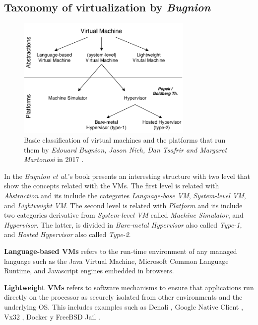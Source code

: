 	\subsection{Taxonomy of virtualization by \textit{Bugnion}}
	
	\begin{figure}[H]
		\centering
		\includegraphics[width=8.5cm]{images/Bugnion2017.pdf}
		\vspace{-0.2cm}
		\caption{Basic classification of virtual machines and the platforms that run them by \textit{Edouard Bugnion, Jason Nieh, Dan Tsafrir and Margaret Martonosi} in 2017 \cite{Bugnion2017}.}
		\label{fig:TaxonomyOfVirtualizationBugnion}
	\end{figure}
	   
    In the \textit{Bugnion et al.}'s book \cite{Bugnion2017}  presents an interesting structure with two level that show the concepts related with the VMs. The first level is related with \textit{Abstraction} and its include the categories \textit{Language-base VM}, \textit{System-level VM}, and \textit{Lightweight VM}. The second level is related with \textit{Platform} and its include two categories derivative from \textit{System-level VM} called \textit{Machine Simulator}, and \textit{Hypervisor}. The latter, is divided in \textit{Bare-metal Hypervisor} also called \textit{Type-1}, and \textit{Hosted Hypervisor} also called \textit{Type-2}.
    
    \textbf{Language-based VMs} refers to the run-time environment of any managed language such as the Java Virtual Machine, Microsoft Common Language Runtime, and Javascript engines embedded in browsers.  
    
    \textbf{Lightweight VMs} refers to software mechanisms to ensure that applications run directly on the processor as securely isolated from other environments and the underlying OS. This includes examples such as Denali \cite {Whitaker2002}, Google Native Client \cite{Yee2009}, Vx32 \cite{Ford2008}, Docker \cite{Docker} y FreeBSD Jail \cite{Kamp2000}.
    
